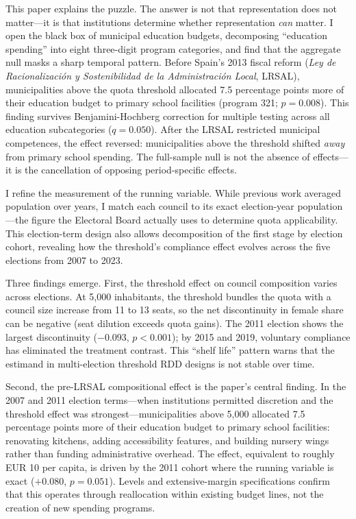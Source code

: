 \documentclass[12pt]{article}
\begin{document}
This paper explains the puzzle. The answer is not that representation does not matter---it is that institutions determine whether representation \emph{can} matter. I open the black box of municipal education budgets, decomposing ``education spending'' into eight three-digit program categories, and find that the aggregate null masks a sharp temporal pattern. Before Spain's 2013 fiscal reform (\emph{Ley de Racionalizaci\'{o}n y Sostenibilidad de la Administraci\'{o}n Local}, LRSAL), municipalities above the quota threshold allocated 7.5 percentage points more of their education budget to primary school facilities (program 321; $p = 0.008$). This finding survives Benjamini-Hochberg correction for multiple testing across all education subcategories ($q = 0.050$). After the LRSAL restricted municipal competences, the effect reversed: municipalities above the threshold shifted \emph{away} from primary school spending. The full-sample null is not the absence of effects---it is the cancellation of opposing period-specific effects.

I refine the measurement of the running variable. While previous work averaged population over years, I match each council to its exact election-year population---the figure the Electoral Board actually uses to determine quota applicability. This election-term design also allows decomposition of the first stage by election cohort, revealing how the threshold's compliance effect evolves across the five elections from 2007 to 2023.

Three findings emerge. First, the threshold effect on council composition varies across elections. At 5,000 inhabitants, the threshold bundles the quota with a council size increase from 11 to 13 seats, so the net discontinuity in female share can be negative (seat dilution exceeds quota gains). The 2011 election shows the largest discontinuity ($-0.093$, $p < 0.001$); by 2015 and 2019, voluntary compliance has eliminated the treatment contrast. This ``shelf life'' pattern warns that the estimand in multi-election threshold RDD designs is not stable over time.

Second, the pre-LRSAL compositional effect is the paper's central finding. In the 2007 and 2011 election terms---when institutions permitted discretion and the threshold effect was strongest---municipalities above 5,000 allocated 7.5 percentage points more of their education budget to primary school facilities: renovating kitchens, adding accessibility features, and building nursery wings rather than funding administrative overhead. The effect, equivalent to roughly EUR 10 per capita, is driven by the 2011 cohort where the running variable is exact ($+0.080$, $p = 0.051$). Levels and extensive-margin specifications confirm that this operates through reallocation within existing budget lines, not the creation of new spending programs.
\end{document}
